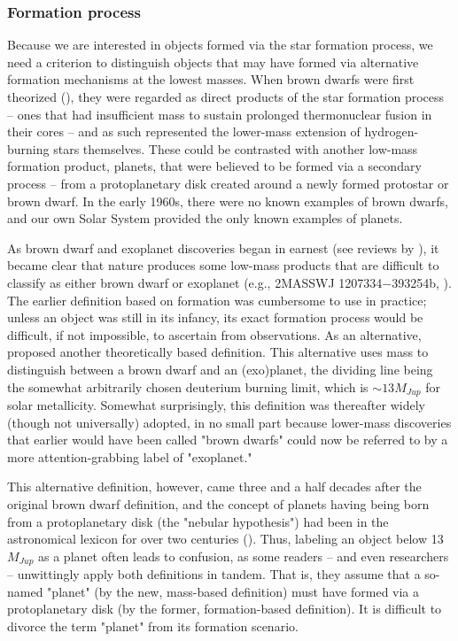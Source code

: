 \documentclass[twocolumn,tighten,twocolappendix]{aastex631}
\begin{document}
\subsubsection{Formation process\label{sec:exoplanets}}

Because we are interested in objects formed via the star formation process, we need a criterion to distinguish objects that may have formed via alternative formation mechanisms at the lowest masses.
When brown dwarfs were first theorized (\citealt{kumar1963,hayashi1963}), they were regarded as direct products of the star formation process -- ones that had insufficient mass to sustain prolonged thermonuclear fusion in their cores -- and as such represented the lower-mass extension of hydrogen-burning stars themselves. These could be contrasted with another low-mass formation product, planets, that were believed to be formed via a secondary process -- from a protoplanetary disk created around a newly formed protostar or brown dwarf. In the early 1960s, there were no known examples of brown dwarfs, and our own Solar System provided the only known examples of planets.

As brown dwarf and exoplanet discoveries began in earnest (see reviews by \citealt{kirkpatrick2005,winn2015}), it became clear that nature produces some low-mass products that are difficult to classify as either brown dwarf or exoplanet (e.g., 2MASSWJ 1207334$-$393254b, \citealt{chauvin2004}). The earlier definition based on formation was cumbersome to use in practice; unless an object was still in its infancy, its exact formation process would be difficult, if not impossible, to ascertain from observations. As an alternative, \cite{burrows1997} proposed another theoretically based definition. This alternative uses mass to distinguish between a brown dwarf and an (exo)planet, the dividing line being the somewhat arbitrarily chosen deuterium burning limit, which is $\sim13 M_{Jup}$ for solar metallicity. Somewhat surprisingly, this definition was thereafter widely (though not universally) adopted, in no small part because lower-mass discoveries that earlier would have been called "brown dwarfs" could now be referred to by a more attention-grabbing label of "exoplanet."

This alternative definition, however, came three and a half decades after the original brown dwarf definition, and the concept of planets having being born from a protoplanetary disk (the "nebular hypothesis") had been in the astronomical lexicon for over two centuries (\citealt{kant1755,laplace1796}). Thus, labeling an object below 13 $M_{Jup}$ as a planet often leads to confusion, as some readers -- and even researchers -- unwittingly apply both definitions in tandem. That is, they assume that a so-named "planet" (by the new, mass-based definition) must have formed via a protoplanetary disk (by the former, formation-based definition). It is difficult to divorce the term "planet" from its formation scenario.
\end{document}
